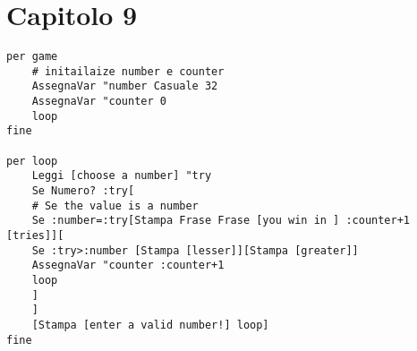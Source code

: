 \section{Capitolo 9}
\begin{lstlisting}
per game
	# initailaize number e counter
	AssegnaVar "number Casuale 32
	AssegnaVar "counter 0
	loop
fine

per loop
	Leggi [choose a number] "try
	Se Numero? :try[
	# Se the value is a number 
	Se :number=:try[Stampa Frase Frase [you win in ] :counter+1 [tries]][
	Se :try>:number [Stampa [lesser]][Stampa [greater]]
	AssegnaVar "counter :counter+1
	loop
	]
	]
	[Stampa [enter a valid number!] loop]
fine
\end{lstlisting}
